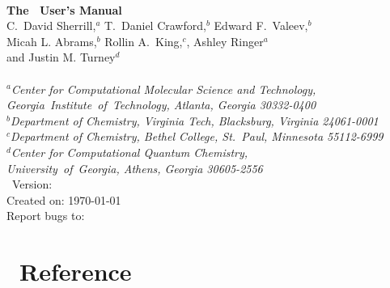 \documentclass[12pt]{article}
\begin{document}


\begin{center}
\ \\
\vspace{2.0in}
{\bf {\Large The \PSIfour\ User's Manual}} \\
\vspace{0.5in}
C.~David Sherrill,$^a$ T.~Daniel Crawford,$^b$ Edward F.~Valeev,$^b$ \\
Micah L. Abrams,$^b$ Rollin A.~King,$^c$, Ashley Ringer$^a$ \\
and Justin M. Turney$^d$\\
\ \\
{\em $^a$Center for Computational Molecular Science and Technology, 
  \mbox{Georgia Institute of Technology,} Atlanta, Georgia 30332-0400} \\
\vspace{0.1in}
{\em $^b$Department of Chemistry, Virginia Tech, Blacksburg, Virginia 
  24061-0001} \\
\vspace{0.1in}
{\em $^c$Department of Chemistry, Bethel College, St.\ Paul, Minnesota 
  55112-6999} \\
\vspace{0.1in}
{\em $^d$Center for Computational Quantum Chemistry, \\
  \mbox{University of Georgia,} Athens, Georgia 30605-2556}
\ \\
\vspace{0.3in}
\PSIfour\ Version: \PSIversion \\
Created on: \today \\
Report bugs to: \PSIemail \\
\end{center}

\thispagestyle{empty}

\newpage
\tableofcontents
\newpage






  
  
  
  
  




\appendix
\section{\PSIfour\ Reference}\label{PSI_Reference}



%



\end{document}
